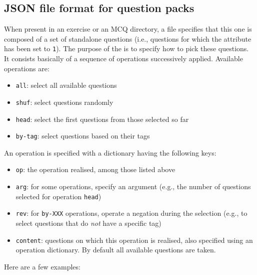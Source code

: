 \subsection{JSON file format for question packs}
\label{subsec:submission/json-file-format}
When present in an exercise or an MCQ directory, a 
file specifies that this one is composed of a set of standalone
questions (i.e., questions for which the  attribute
has been set to \verb+1+). The purpose of the  is to
specify how to pick these questions. It consists basically of a
sequence of operations successively applied. Available operations are:
\begin{itemize}
\item \verb+all+: select all available questions
\item \verb+shuf+: select questions randomly
\item \verb+head+: select the first questions from those selected so far
\item \verb+by-tag+: select questions based on their tags
\end{itemize}

An operation is specified with a dictionary having the following keys:
\begin{itemize}
\item \verb+op+: the operation realised, among those listed above
\item \verb+arg+: for some operations, specify an argument (e.g., the
  number of questions selected for operation \verb+head+)
\item \verb+rev+: for \verb+by-XXX+ operations, operate a negation
  during the selection (e.g., to select questions that do {\em not}
  have a specific tag)
\item \verb+content+: questions on which this operation is realised,
  also specified using an operation dictionary. By default all
  available questions are taken.
\end{itemize}
  
Here are a few examples:

